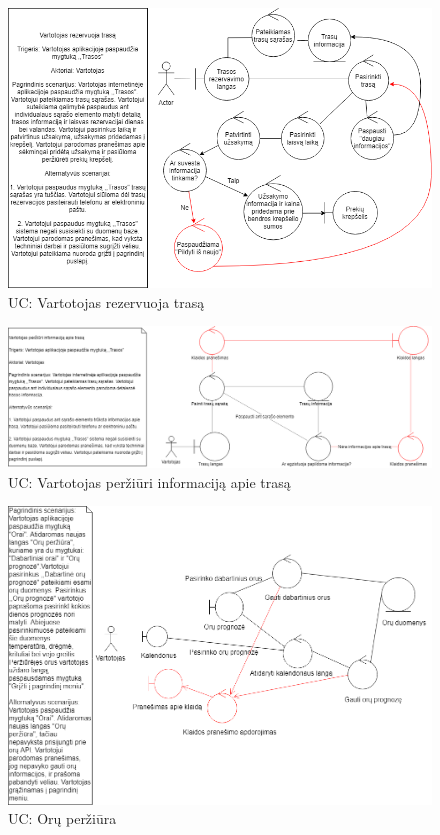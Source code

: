 \documentclass[oneside]{VUMIFPSkursinis}
\begin{document}
\begin{figure}[h]
    \centering
    \includegraphics[width=1.0\textwidth]{Robust8.png}
    \caption{UC: Vartotojas rezervuoja trasą}
    \label{fig:rob8}
\end{figure}
\vskip 1cm

\begin{figure}[h]
    \centering
    \includegraphics[width=1.0\textwidth]{Rob9.png}
    \caption{UC: Vartotojas peržiūri informaciją apie trasą}
    \label{fig:rob9}
\end{figure}
\vskip 1cm

\begin{figure}[h]
    \centering
    \includegraphics[width=1.0\textwidth]{Rob10.png}
    \caption{UC: Orų peržiūra}
    \label{fig:rob10}
\end{figure}
\vskip 1cm
\end{document}
